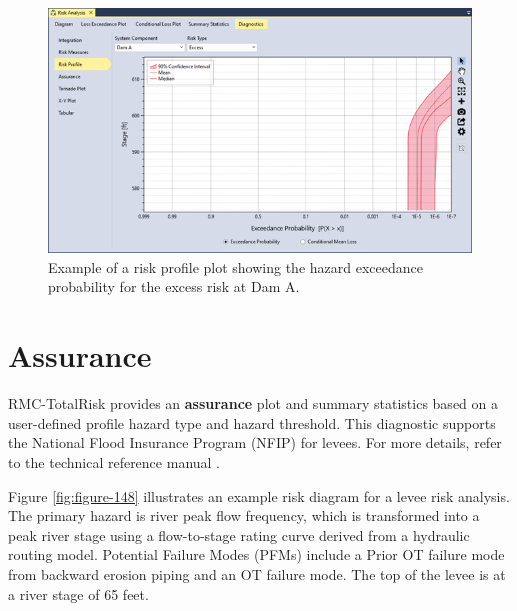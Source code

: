 \documentclass[
]{book}
\begin{document}
\begin{figure}

{\centering \includegraphics{images/figure147} 

}

\caption{Example of a risk profile plot showing the hazard exceedance probability for the excess risk at Dam A.}\label{fig:figure-147}
\end{figure}

\hypertarget{assurance}{%
\section{Assurance}\label{assurance}}

RMC-TotalRisk provides an \textbf{assurance} plot and summary statistics based on a user-defined profile hazard type and hazard threshold. This diagnostic supports the National Flood Insurance Program (NFIP) for levees. For more details, refer to the technical reference manual \citep{cite-TechRef}.

Figure \ref{fig:figure-148} illustrates an example risk diagram for a levee risk analysis. The primary hazard is river peak flow frequency, which is transformed into a peak river stage using a flow-to-stage rating curve derived from a hydraulic routing model. Potential Failure Modes (PFMs) include a Prior OT failure mode from backward erosion piping and an OT failure mode. The top of the levee is at a river stage of 65 feet.
\end{document}
